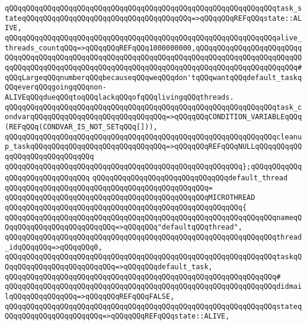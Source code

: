 \verb|qQQqqQQqqQQqqQQqqQQqqQQqqQQqqQQqqQQqqQQqqQQqqQQqqQQqqQQqqQQqqQQqtask_stateqQQqqQQqqQQqqQQqqQQqqQQqqQQqqQQqqQQqqQQq=>qQQqqQQqREFqQQqstate::ALIVE,|\newline
\verb|qQQqqQQqqQQqqQQqqQQqqQQqqQQqqQQqqQQqqQQqqQQqqQQqqQQqqQQqqQQqqQQqalive_threads_countqQQq=>qQQqqQQqREFqQQq1000000000,qQQqqQQqqQQqqQQqqQQqqQQqqQQqqQQqqQQqqQQqqQQqqQQqqQQqqQQqqQQqqQQqqQQqqQQqqQQqqQQqqQQqqQQqqQQqqQQqqQQqqQQqqQQqqQQqqQQqqQQqqQQqqQQqqQQqqQQqqQQqqQQqqQQqqQQqqQQqqQQqqQQq#qQQqLargeqQQqnumberqQQqbecauseqQQqweqQQqdon'tqQQqwantqQQqdefault_taskqQQqeverqQQqgoingqQQqnon-ALIVEqQQqdueqQQqtoqQQqlackqQQqofqQQqlivingqQQqthreads.|\newline
\verb|qQQqqQQqqQQqqQQqqQQqqQQqqQQqqQQqqQQqqQQqqQQqqQQqqQQqqQQqqQQqqQQqtask_condvarqQQqqQQqqQQqqQQqqQQqqQQqqQQqqQQq=>qQQqqQQqCONDITION_VARIABLEqQQq(REFqQQq(CONDVAR_IS_NOT_SETqQQq[])),|\newline
\verb|qQQqqQQqqQQqqQQqqQQqqQQqqQQqqQQqqQQqqQQqqQQqqQQqqQQqqQQqqQQqqQQqcleanup_taskqQQqqQQqqQQqqQQqqQQqqQQqqQQqqQQq=>qQQqqQQqREFqQQqNULLqQQqqQQqqQQqqQQqqQQqqQQqqQQqqQQq|\newline
\verb|qQQqqQQqqQQqqQQqqQQqqQQqqQQqqQQqqQQqqQQqqQQqqQQqqQQqqQQq};qQQqqQQqqQQqqQQqqQQqqQQqqQQqqQQq|\newline
\newline
\verb|qQQqqQQqqQQqqQQqqQQqqQQqqQQqqQQqdefault_thread|\newline
\verb|qQQqqQQqqQQqqQQqqQQqqQQqqQQqqQQqqQQqqQQqqQQqqQQq=|\newline
\verb|qQQqqQQqqQQqqQQqqQQqqQQqqQQqqQQqqQQqqQQqqQQqqQQqMICROTHREAD|\newline
\verb|qQQqqQQqqQQqqQQqqQQqqQQqqQQqqQQqqQQqqQQqqQQqqQQqqQQqqQQq{|\newline
\verb|qQQqqQQqqQQqqQQqqQQqqQQqqQQqqQQqqQQqqQQqqQQqqQQqqQQqqQQqqQQqqQQqnameqQQqqQQqqQQqqQQqqQQqqQQqqQQq=>qQQqqQQq"defaultqQQqthread",|\newline
\verb|qQQqqQQqqQQqqQQqqQQqqQQqqQQqqQQqqQQqqQQqqQQqqQQqqQQqqQQqqQQqqQQqthread_idqQQqqQQq=>qQQqqQQq0,|\newline
\verb|qQQqqQQqqQQqqQQqqQQqqQQqqQQqqQQqqQQqqQQqqQQqqQQqqQQqqQQqqQQqqQQqtaskqQQqqQQqqQQqqQQqqQQqqQQqqQQq=>qQQqqQQqdefault_task,|\newline
\verb|qQQqqQQqqQQqqQQqqQQqqQQqqQQqqQQqqQQqqQQqqQQqqQQqqQQqqQQqqQQqqQQq#|\newline
\verb|qQQqqQQqqQQqqQQqqQQqqQQqqQQqqQQqqQQqqQQqqQQqqQQqqQQqqQQqqQQqqQQqdidmailqQQqqQQqqQQqqQQq=>qQQqqQQqREFqQQqFALSE,|\newline
\verb|qQQqqQQqqQQqqQQqqQQqqQQqqQQqqQQqqQQqqQQqqQQqqQQqqQQqqQQqqQQqqQQqstateqQQqqQQqqQQqqQQqqQQqqQQq=>qQQqqQQqREFqQQqstate::ALIVE,|\newline
